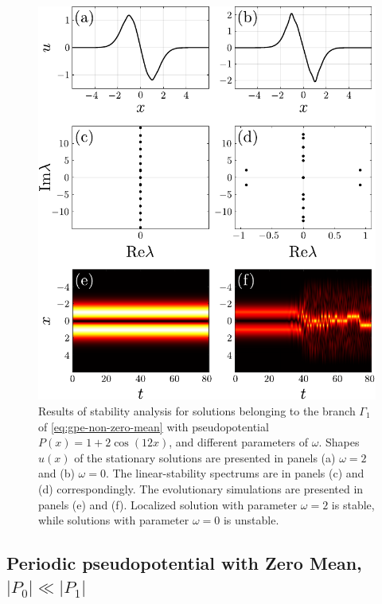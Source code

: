 \begin{figure}[h]
\centering
	\includegraphics[scale = 1]{pic/stability, non-zero mean cosine nho}
	\caption{
		Results of stability analysis for solutions belonging to the branch $\Gamma_1$ of \eqref{eq:gpe-non-zero-mean} with pseudopotential $P(x) = 1 + 2 \cos (12 x)$, and different parameters of $\omega$.
		Shapes $u(x)$ of the stationary solutions are presented in panels (a) $\omega = 2$ and (b) $\omega = 0$.
		The linear-stability spectrums are in panels (c) and (d) correspondingly.
		The evolutionary simulations are presented in panels (e) and (f).
		Localized solution with parameter $\omega = 2$ is stable, while solutions with parameter $\omega = 0$ is unstable.
	}
\label{fig:stability-nho-non-zero-mean}
\end{figure}

\subsection{Periodic pseudopotential with Zero Mean, $|P_0| \ll |P_1|$}

